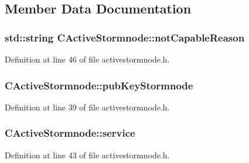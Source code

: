 \subsection{Member Data Documentation}
\hypertarget{class_c_active_stormnode_a53990dc82bb42330202a5fa686ac17d1}{}
\subsubsection[{not\+Capable\+Reason}]{\setlength{\rightskip}{0pt plus 5cm}std\+::string C\+Active\+Stormnode\+::not\+Capable\+Reason}\label{class_c_active_stormnode_a53990dc82bb42330202a5fa686ac17d1}


Definition at line 46 of file activestormnode.\+h.

\hypertarget{class_c_active_stormnode_ab6f5257c65356ed738eb9c0187f42f33}{}
\subsubsection[{pub\+Key\+Stormnode}]{ C\+Active\+Stormnode\+::pub\+Key\+Stormnode}\label{class_c_active_stormnode_ab6f5257c65356ed738eb9c0187f42f33}


Definition at line 39 of file activestormnode.\+h.

\hypertarget{class_c_active_stormnode_ac1bd510de0060b100f5c9a1ed520c0c5}{}
\subsubsection[{service}]{ C\+Active\+Stormnode\+::service}\label{class_c_active_stormnode_ac1bd510de0060b100f5c9a1ed520c0c5}


Definition at line 43 of file activestormnode.\+h.

\hypertarget{class_c_active_stormnode_a8ab0534b87cbee04dfae4eff95d83786}{}
